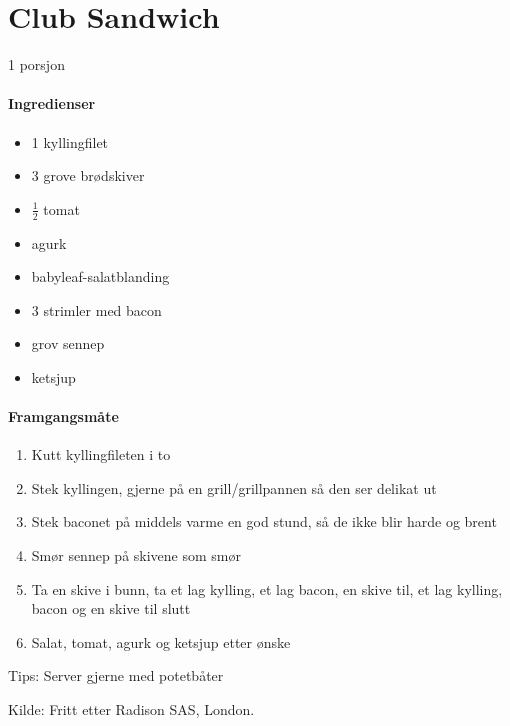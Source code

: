 \section{﻿Club Sandwich}
1 porsjon

\paragraph{Ingredienser}
\begin{itemize}[noitemsep]
	\item 1 kyllingfilet
	\item 3 grove brødskiver
	\item $\frac{1}{2}$ tomat
	\item agurk
	\item babyleaf-salatblanding
	\item 3 strimler med bacon
	\item grov sennep
	\item ketsjup
\end{itemize}

\paragraph{Framgangsmåte}
\begin{enumerate}[noitemsep]
	\item Kutt kyllingfileten i to
	\item Stek kyllingen, gjerne på en grill/grillpannen så den ser delikat ut
	\item Stek baconet på middels varme en god stund, så de ikke blir harde og brent
	\item Smør sennep på skivene som smør
	\item Ta en skive i bunn, ta et lag kylling, et lag bacon, en skive til, et lag kylling, bacon og en skive til slutt
	\item Salat, tomat, agurk og ketsjup etter ønske
\end{enumerate}

Tips:
Server gjerne med potetbåter

Kilde: Fritt etter Radison SAS, London.
